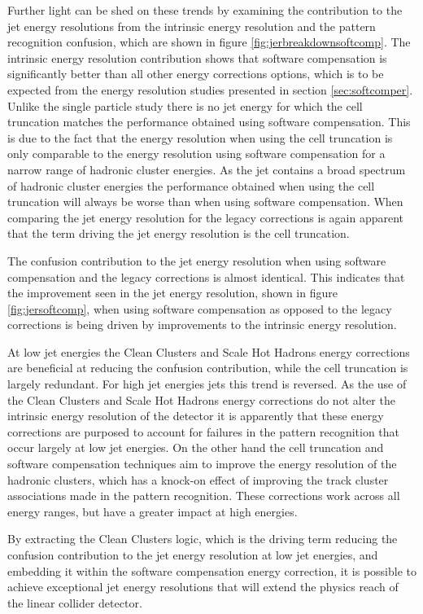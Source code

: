 Further light can be shed on these trends by examining the contribution to the jet energy resolutions from the intrinsic energy resolution and the pattern recognition confusion, which are shown in figure \ref{fig:jerbreakdownsoftcomp}.  The intrinsic energy resolution contribution shows that software compensation is significantly better than all other energy corrections options, which is to be expected from the energy resolution studies presented in section \ref{sec:softcomper}.  Unlike the single particle study there is no jet energy for which the cell truncation matches the performance obtained using software compensation.  This is due to the fact that the energy resolution when using the cell truncation is only comparable to the energy resolution using software compensation for a narrow range of hadronic cluster energies.  As the jet contains a broad spectrum of hadronic cluster energies the performance obtained when using the cell truncation will always be worse than when using software compensation.  When comparing the jet energy resolution for the legacy corrections is again apparent that the term driving the jet energy resolution is the cell truncation.

The confusion contribution to the jet energy resolution when using software compensation and the legacy corrections is almost identical.  This indicates that the improvement seen in the jet energy resolution, shown in figure \ref{fig:jersoftcomp}, when using software compensation as opposed to the legacy corrections is being driven by improvements to the intrinsic energy resolution.  

At low jet energies the Clean Clusters and Scale Hot Hadrons energy corrections are beneficial at reducing the confusion contribution, while the cell truncation is largely redundant.  For high jet energies jets this trend is reversed.  As the use of the Clean Clusters and Scale Hot Hadrons energy corrections do not alter the intrinsic energy resolution of the detector it is apparently that these energy corrections are purposed to account for failures in the pattern recognition that occur largely at low jet energies.  On the other hand the cell truncation and software compensation techniques aim to improve the energy resolution of the hadronic clusters, which has a knock-on effect of improving the track cluster associations made in the pattern recognition.  These corrections work across all energy ranges, but have a greater impact at high energies.  

By extracting the Clean Clusters logic, which is the driving term reducing the confusion contribution to the jet energy resolution at low jet energies, and embedding it within the software compensation energy correction, it is possible to achieve exceptional jet energy resolutions that will extend the physics reach of the linear collider detector.  

